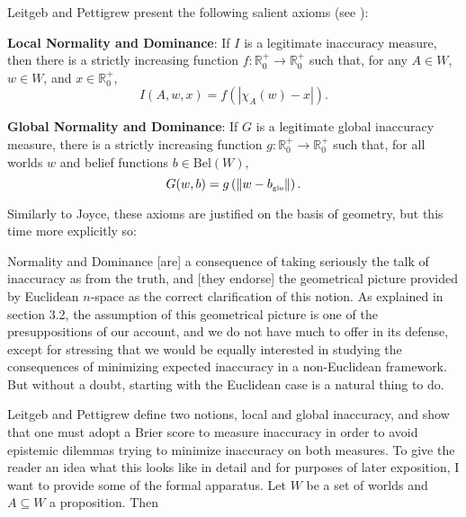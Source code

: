\documentclass[11pt]{article}
\begin{document}
Leitgeb and Pettigrew present the following salient axioms (see
):

\begin{quotex}
  \textbf{Local Normality and Dominance}: If $I$ is a legitimate
  inaccuracy measure, then there is a strictly increasing function
  $f:\mathbb{R}^{+}_{0}\rightarrow\mathbb{R}^{+}_{0}$ such that, for
  any $A\in{}W$, $w\in{}W$, and $x\in\mathbb{R}^{+}_{0}$,
  \begin{equation}
    \label{eq:e4}
    I(A,w,x)=f\left(|\chi_{A}(w)-x|\right).
  \end{equation}
\end{quotex}

\begin{quotex}
  \textbf{Global Normality and Dominance}: If $G$ is a legitimate
  global inaccuracy measure, there is a strictly increasing function
  $g:\mathbb{R}^{+}_{0}\rightarrow\mathbb{R}^{+}_{0}$ such that, for
  all worlds $w$ and belief functions $b\in{}\mbox{Bel}(W)$,
  \begin{equation}
    \label{eq:e5}
  G(w,b)=g\left(\|w-b_{\mbox{{\tiny glo}}}\|\right).
  \end{equation}
\end{quotex}

Similarly to Joyce, these axioms are justified on the basis of
geometry, but this time more explicitly so:

\begin{quotex}
  Normality and Dominance [are] a consequence of taking seriously the
  talk of inaccuracy as  from the truth, and [they
  endorse] the geometrical picture provided by Euclidean $n$-space as
  the correct clarification of this notion. As explained in section
  3.2, the assumption of this geometrical picture is one of the
  presuppositions of our account, and we do not have much to offer in
  its defense, except for stressing that we would be equally
  interested in studying the consequences of minimizing expected
  inaccuracy in a non-Euclidean framework. But without a doubt,
  starting with the Euclidean case is a natural thing to do.
\end{quotex}

Leitgeb and Pettigrew define two notions, local and global inaccuracy,
and show that one must adopt a Brier score to measure inaccuracy in
order to avoid epistemic dilemmas trying to minimize inaccuracy on
both measures. To give the reader an idea what this looks like in
detail and for purposes of later exposition, I want to provide some of
the formal apparatus. Let $W$ be a set of worlds and $A\subseteq{}W$ a
proposition. Then
\end{document}
